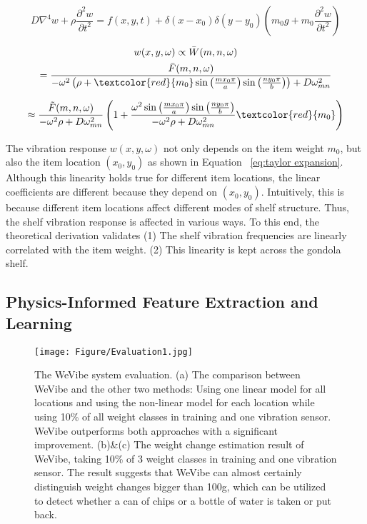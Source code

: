 \begin{equation}
D\nabla^4 w + \rho \frac{\partial^2 w}{\partial t^2} = f(x, y, t) + \delta(x-x_0)\delta(y-y_0)(m_0g + m_0\frac{\partial^2 w}{\partial t^2})
\label{eq:gov_eq}
\end{equation}

\begin{equation}
\begin{gathered}
w(x, y, \omega) \propto  \bar{W}(m,n,\omega) \\
= \frac{\bar{F}(m,n,\omega)}{-\omega^2 \left( \rho + \textcolor{red}{m_0} \sin\left( \frac{m x_0 \pi}{a} \right) \sin\left( \frac{n y_0 \pi}{b} \right) \right) + D \omega^2_{mn}}
\label{eq:solution}
\end{gathered}
\end{equation}

\begin{equation}
\begin{gathered}
\approx \frac{\tilde{F}(m, n, \omega)}{-\omega^2 \rho + D \omega_{mn}^2} \left( 1 + \frac{\omega^2 \sin \left( \frac{m x_0 \pi}{a} \right) \sin \left( \frac{n y_0 \pi}{b} \right)}{-\omega^2 \rho + D \omega_{mn}^2} \textcolor{red}{m_0} \right)
\label{eq:taylor expansion}
\end{gathered}
\end{equation}

The vibration response $w(x,y,\omega)$ not only depends on the item weight $m_0$, but also the item location $(x_0, y_0)$ as shown in Equation ~\ref{eq:taylor expansion}. Although this linearity holds true for different item locations, the linear coefficients are different because they depend on $(x_0, y_0)$. Intuitively, this is because different item locations affect different modes of shelf structure. Thus, the shelf vibration response is affected in various ways. To this end, the theoretical derivation validates (1) The shelf vibration frequencies are linearly correlated with the item weight. (2) This linearity is kept across the gondola shelf.


\subsection{Physics-Informed Feature Extraction and Learning}
\label{sec: Feature Extraction and Learning}

\begin{figure*}[t]
    \centering
    \texttt{[image: Figure/Evaluation1.jpg]}
    \caption{The WeVibe system evaluation. (a) The comparison between WeVibe and the other two methods: Using one linear model for all locations and using the non-linear model for each location while using 10\% of all weight classes in training and one vibration sensor. WeVibe outperforms both approaches with a significant improvement. (b)\&(c) The weight change estimation result of WeVibe, taking 10\% of 3 weight classes in training and one vibration sensor. The result suggests that WeVibe can almost certainly distinguish weight changes bigger than 100g, which can be utilized to detect whether a can of chips or a bottle of water is taken or put back.}
    \label{fig:Evaluation1}
\end{figure*}

